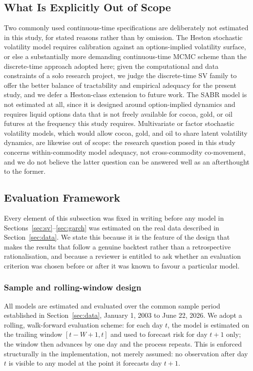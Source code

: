 \documentclass[preprint,12pt,authoryear]{elsarticle}
\begin{document}
\subsection{What Is Explicitly Out of Scope}
\label{sec:outofscope}

Two commonly used continuous-time specifications are deliberately not estimated in this study, for stated reasons rather than by omission. The Heston stochastic volatility model requires calibration against an options-implied volatility surface, or else a substantially more demanding continuous-time MCMC scheme than the discrete-time approach adopted here; given the computational and data constraints of a solo research project, we judge the discrete-time SV family to offer the better balance of tractability and empirical adequacy for the present study, and we defer a Heston-class extension to future work. The SABR model is not estimated at all, since it is designed around option-implied dynamics and requires liquid options data that is not freely available for cocoa, gold, or oil futures at the frequency this study requires. Multivariate or factor stochastic volatility models, which would allow cocoa, gold, and oil to share latent volatility dynamics, are likewise out of scope: the research question posed in this study concerns within-commodity model adequacy, not cross-commodity co-movement, and we do not believe the latter question can be answered well as an afterthought to the former.

\subsection{Evaluation Framework}
\label{sec:evaluation}

Every element of this subsection was fixed in writing before any model in Sections~\ref{sec:sv}--\ref{sec:garch} was estimated on the real data described in Section~\ref{sec:data}. We state this because it is the feature of the design that makes the results that follow a genuine backtest rather than a retrospective rationalisation, and because a reviewer is entitled to ask whether an evaluation criterion was chosen before or after it was known to favour a particular model.

\subsubsection{Sample and rolling-window design}

All models are estimated and evaluated over the common sample period established in Section~\ref{sec:data}, January 1, 2003 to June 22, 2026. We adopt a rolling, walk-forward evaluation scheme: for each day $t$, the model is estimated on the trailing window $[t-W+1, t]$ and used to forecast risk for day $t+1$ only; the window then advances by one day and the process repeats. This is enforced structurally in the implementation, not merely assumed: no observation after day $t$ is visible to any model at the point it forecasts day $t+1$.
\end{document}
